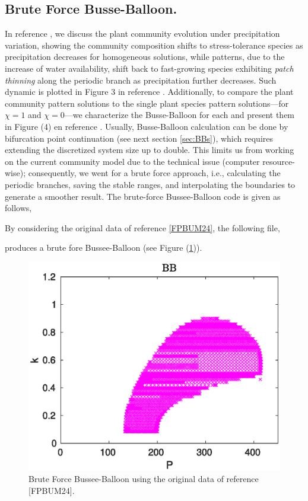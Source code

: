 \documentclass[a4paper,12pt]{article}
\begin{document}
\subsection{Brute Force Busse-Balloon.}
In reference \cite{FPBUM24}, we discuss the plant community evolution under precipitation variation, showing the community composition shifts to stress-tolerance species as precipitation decreases for homogeneous solutions, while patterns, due to the increase of water availability, shift back to fast-growing species exhibiting {\it patch thinning} along the periodic branch as precipitation further decreases. Such dynamic is plotted in Figure 3 in reference \cite{FPBUM24}. Additionally, to compare the plant community pattern solutions to the single plant species pattern solutions---for $\chi=1$ and $\chi=0$---we characterize the Busse-Balloon for each and present them in Figure (4) en reference \cite{FPBUM24}. Usually, Busse-Balloon calculation can be done by bifurcation point continuation (see next section \ref{sec:BBs}), which requires extending the discretized system size up to double. This limits us from working on the current community model due to the technical issue (computer resource-wise); consequently, we went for a brute force approach, i.e., calculating the periodic branches, saving the stable ranges, and interpolating the boundaries to generate a smoother result. 
The brute-force Bussee-Balloon code is given as follows,

By considering the original data of reference \ref{FPBUM24}, the following file,

produces a brute fore Bussee-Balloon (see Figure (\ref{fig:brut_for_bb})).
\begin{figure}
    \centering
    \includegraphics[width=0.6\linewidth]{BBcom.eps}
    \caption{Brute Force Bussee-Balloon using the original data of reference [FPBUM24].}
    \label{fig:brut_for_bb}
\end{figure}
\end{document}
